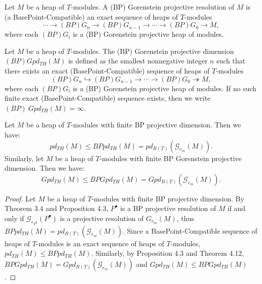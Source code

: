 \documentclass[11pt, twoside]{article}
\begin{document}
\begin{definition}
Let $M$ be a heap of $T$-modules. A (BP) Gorenstein projective resolution of $M$ is (a BasePoint-Compatible) an exact sequence of heaps of $T$-modules
$$ \cdots \to (BP)G_n \to (BP)G_{n-1} \to \cdots \to (BP)G_0 \to M,$$
where each $(BP)G_i$ is a (BP) Gorenstein projective heap of modules.
\end{definition}

\begin{definition}
Let $M$ be a heap of $T$-modules. The (BP) Gorenstein projective dimension $(BP)Gpd_{TH}(M)$ is defined as the smallest nonnegative integer $n$ such that there exists an exact (BasePoint-Compatible) sequence of heaps of $T$-modules
$$(BP)G_n \hookrightarrow (BP)G_{n-1} \to \cdots \to (BP)G_0 \twoheadrightarrow M,$$
where each $(BP)G_i$ is a (BP) Gorenstein projective heap of modules. If no such finite exact (BasePoint-Compatible) sequence exists, then we write $(BP)~Gpd_{TH}(M) = \infty$.
\end{definition}

\begin{theorem}
Let $M$ be a heap of $T$-modules with finite BP projective dimension. Then we have:
$$ pd_{TH}(M) \leq BPpd_{TH}(M) = pd_{R(T)}(\mathcal{G}_{e_m}(M)).$$
Similarly, let $M$ be a heap of $T$-modules with finite BP Gorenstein projective dimension. Then we have:
$$ Gpd_{TH}(M) \leq BPGpd_{TH}(M) = Gpd_{R(T)}(\mathcal{G}_{e_m}(M)).$$
\end{theorem}
\begin{proof}
Let $M$ be a heap of $T$-modules with finite BP projective dimension. By Theorem 3.4 and Proposition 4.3, $P^\bullet$ is a BP projective resolution of $M$ if and only if $\mathcal{G}_{e_{P^\bullet}}(P^\bullet)$ is a projective resolution of $G_{e_m}(M)$, thus $BPpd_{TH}(M) = pd_{R(T)}(\mathcal{G}_{e_m}(M))$. Since a BasePoint-Compatible sequence of heaps of $T$-modules is an exact sequence of heaps of $T$-modules, $pd_{TH}(M) \leq BPpd_{TH}(M)$. Similarly, by Proposition 4.3 and Theorem 4.12, $BPGpd_{TH}(M) = Gpd_{R(T)}(\mathcal{G}_{e_m}(M))$ and $Gpd_{TH}(M) \leq BPGpd_{TH}(M)$.
\end{proof}
\end{document}
